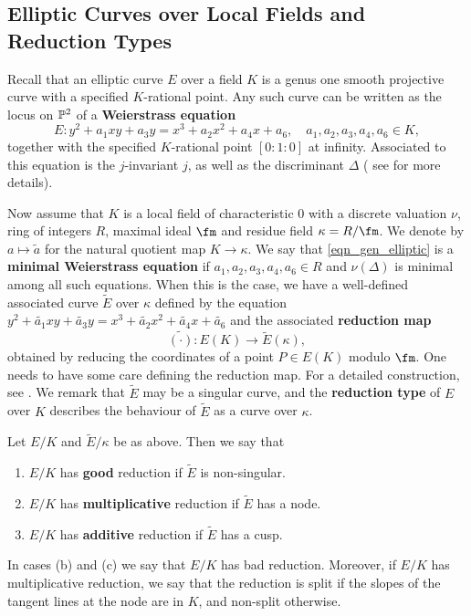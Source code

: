 \subsection{Elliptic Curves over Local Fields and Reduction Types}

Recall that an elliptic curve $E$ over a field $K$ is a genus one smooth projective curve with a specified $K$-rational point. Any such curve can be written as the locus on $\mathbb{P}^2$ of a \textbf{Weierstrass equation}
\begin{equation}\label{eqn_gen_elliptic}\tag{*}
    E: y^2+a_1xy+a_3y=x^3+a_2x^2+a_4x+a_6,\quad a_1,a_2,a_3,a_4,a_6\in K,
\end{equation}
together with the specified $K$-rational point $[0:1:0]$ at infinity. Associated to this equation is the $j$-invariant $j$, as well as the discriminant $\Delta$ ( see \cite[\S III.1]{S1} for more details). 

Now assume that $K$ is a local field of characteristic $0$ with a discrete valuation $\nu$, ring of integers $R$, maximal ideal $\fm$ and residue field $\kappa = R / \fm$. We denote by $a\mapsto \tilde{a}$ for the natural quotient map $K\to\kappa$. We say that \eqref{eqn_gen_elliptic} is a \textbf{minimal Weierstrass equation} if $a_1,a_2,a_3,a_4,a_6\in R$ and $\nu(\Delta)$ is minimal among all such equations. When this is the case, we have a well-defined associated curve $\tilde{E}$ over $\kappa$ defined by the equation $y^2+\tilde{a_1}xy+\tilde{a_3}y=x^3+\tilde{a_2}x^2+\tilde{a_4}x+\tilde{a_6}$ and the associated \textbf{reduction map}
\begin{equation*}%
    \widetilde{(\cdot)}:E(K)\longrightarrow \tilde{E}(\kappa),
\end{equation*}
obtained by reducing the coordinates of a point $P\in E(K)$ modulo $\fm$. One needs to have some care defining the reduction map. For a detailed construction, see \cite[\S1 VII.2]{S1}. We remark that $\tilde{E}$ may be a singular curve, and the \textbf{reduction type} of $E$ over $K$ describes the behaviour of $\tilde{E}$ as a curve over $\kappa$.

\begin{defn}
    Let $E/K$ and $\tilde{E}/\kappa$ be as above. Then we say that 
    \begin{enumerate}[label={(\alph*)}]
        \item $E/K$ has \textbf{good} reduction if $\tilde{E}$ is non-singular.
        \item $E/K$ has \textbf{multiplicative} reduction if $\tilde{E}$ has a node.
        \item $E/K$ has \textbf{additive} reduction if $\tilde{E}$ has a cusp.
    \end{enumerate}
    In cases (b) and (c) we say that $E/K$ has bad reduction. Moreover, if $E/K$ has multiplicative reduction, we say that the reduction is split if the slopes of the tangent lines at the node are in $K$, and non-split otherwise.
\end{defn}

